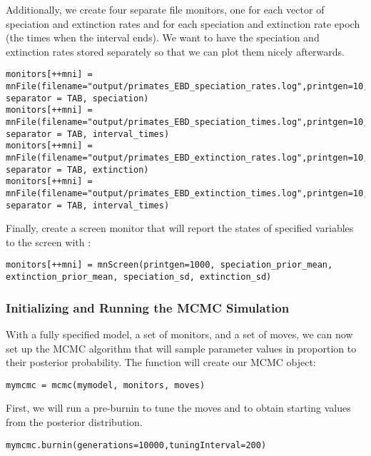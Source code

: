 Additionally, we create four separate file monitors, one for each vector of speciation and extinction rates and for each speciation and extinction rate epoch (\IE the times when the interval ends).
We want to have the speciation and extinction rates stored separately so that we can plot them nicely afterwards.
{\tt \begin{snugshade*}
\begin{lstlisting}
monitors[++mni] = mnFile(filename="output/primates_EBD_speciation_rates.log",printgen=10, separator = TAB, speciation)
monitors[++mni] = mnFile(filename="output/primates_EBD_speciation_times.log",printgen=10, separator = TAB, interval_times)
monitors[++mni] = mnFile(filename="output/primates_EBD_extinction_rates.log",printgen=10, separator = TAB, extinction)
monitors[++mni] = mnFile(filename="output/primates_EBD_extinction_times.log",printgen=10, separator = TAB, interval_times)
\end{lstlisting}
\end{snugshade*}}

Finally, create a screen monitor that will report the states of specified variables to the screen with :
{\tt \begin{snugshade*}
\begin{lstlisting}
monitors[++mni] = mnScreen(printgen=1000, speciation_prior_mean, extinction_prior_mean, speciation_sd, extinction_sd)
\end{lstlisting}
\end{snugshade*}}

\subsubsection{Initializing and Running the MCMC Simulation}

With a fully specified model, a set of monitors, and a set of moves, we can now set up the MCMC algorithm that will sample parameter values in proportion to their posterior probability. The  function will create our MCMC object:
{\tt \begin{snugshade*}
\begin{lstlisting}
mymcmc = mcmc(mymodel, monitors, moves)
\end{lstlisting}
\end{snugshade*}}

First, we will run a pre-burnin to tune the moves and to obtain starting values from the posterior distribution.
{\tt \begin{snugshade*}
\begin{lstlisting}
mymcmc.burnin(generations=10000,tuningInterval=200)
\end{lstlisting}
\end{snugshade*}}



